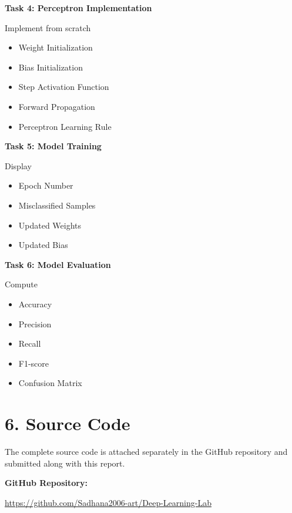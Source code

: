 \documentclass[11pt]{article}
\begin{document}
\vspace{2mm}

\textbf{Task 4: Perceptron Implementation}

Implement from scratch

\begin{itemize}
\item Weight Initialization
\item Bias Initialization
\item Step Activation Function
\item Forward Propagation
\item Perceptron Learning Rule
\end{itemize}

\vspace{2mm}

\textbf{Task 5: Model Training}

Display

\begin{itemize}
\item Epoch Number
\item Misclassified Samples
\item Updated Weights
\item Updated Bias
\end{itemize}

\vspace{2mm}

\textbf{Task 6: Model Evaluation}

Compute

\begin{itemize}
\item Accuracy
\item Precision
\item Recall
\item F1-score
\item Confusion Matrix
\end{itemize}

\section*{6. Source Code}

The complete source code is attached separately in the GitHub repository and submitted along with this report.

\textbf{GitHub Repository:}

\url{https://github.com/Sadhana2006-art/Deep-Learning-Lab}
\end{document}
